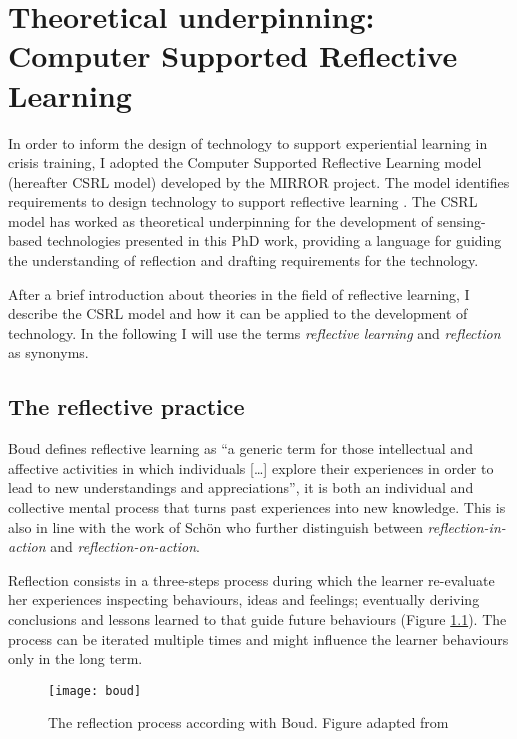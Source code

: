 \chapter[Theoretical underpinning:\\ Computer Supported Reflective Learning]{Theoretical underpinning: Computer Supported Reflective Learning}\label{csrl}


In order to inform the design of technology to support experiential learning in crisis training, I adopted the Computer Supported Reflective Learning model (hereafter CSRL model) developed by the MIRROR project. The model identifies requirements to design technology to support reflective learning \autocite{Krogstie:2013kf}. The CSRL model has worked as theoretical underpinning for the development of sensing-based technologies presented in this PhD work, providing a language for guiding the understanding of reflection and drafting requirements for the technology.

After a brief introduction about theories in the field of reflective learning, I describe the CSRL model and how it can be applied to the development of technology. In the following I will use the terms \emph{reflective learning} and \emph{reflection} as synonyms.

\section{The reflective practice}\label{reflection-as-a-tool-for-learning-from-experiences}

Boud \autocite*{boud1985reflection} defines reflective learning as ``a generic term for those intellectual and affective activities in which individuals {[}\ldots{}{]} explore their experiences in order to lead to new understandings and appreciations'', it is both an individual and collective mental process that turns past experiences into new knowledge. This is also in line with the work of Sch\"on \autocite*{Schon:1983ut} who further distinguish between \emph{reflection-in-action} and \emph{reflection-on-action}.

Reflection consists in a three-steps process during which the learner re-evaluate her experiences inspecting behaviours, ideas and feelings; eventually deriving conclusions and lessons learned to that guide future behaviours (Figure \ref{fig:boud-model}). The process can be iterated multiple times and might influence the learner behaviours only in the long term.
\begin{figure}
	[tbh] \centering 
	\texttt{[image: boud]} \caption{The reflection process according with Boud. Figure adapted from \protect\autocite{boud1985reflection}} \label{fig:boud-model} 
\end{figure}

